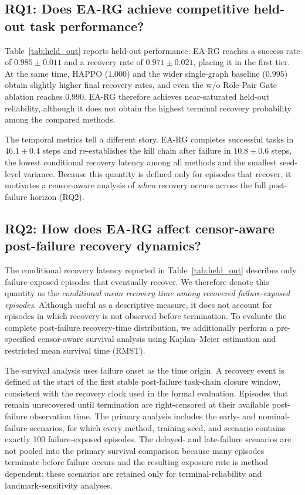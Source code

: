 \subsection{RQ1: Does EA-RG achieve competitive held-out task performance?}

Table~\ref{tab:held_out} reports held-out performance. EA-RG reaches a success rate of $0.985 \pm 0.011$ and a recovery rate of $0.971 \pm 0.021$, placing it in the first tier. At the same time, HAPPO ($1.000$) and the wider single-graph baseline ($0.995$) obtain slightly higher final recovery rates, and even the w/o Role-Pair Gate ablation reaches $0.990$. EA-RG therefore achieves near-saturated held-out reliability, although it does not obtain the highest terminal recovery probability among the compared methods.

The temporal metrics tell a different story. EA-RG completes successful tasks in $46.1 \pm 0.4$ steps and re-establishes the kill chain after failure in $10.8 \pm 0.6$ steps, the lowest conditional recovery latency among all methods and the smallest seed-level variance. Because this quantity is defined only for episodes that recover, it motivates a censor-aware analysis of \emph{when} recovery occurs across the full post-failure horizon (RQ2).



\subsection{RQ2: How does EA-RG affect censor-aware post-failure recovery dynamics?}

The conditional recovery latency reported in Table~\ref{tab:held_out} describes only failure-exposed episodes that eventually recover. We therefore denote this quantity as the \emph{conditional mean recovery time among recovered failure-exposed episodes}. Although useful as a descriptive measure, it does not account for episodes in which recovery is not observed before termination. To evaluate the complete post-failure recovery-time distribution, we additionally perform a pre-specified censor-aware survival analysis using Kaplan--Meier estimation and restricted mean survival time (RMST).

The survival analysis uses failure onset as the time origin. A recovery event is defined at the start of the first stable post-failure task-chain closure window, consistent with the recovery clock used in the formal evaluation. Episodes that remain unrecovered until termination are right-censored at their available post-failure observation time. The primary analysis includes the early- and nominal-failure scenarios, for which every method, training seed, and scenario contains exactly 100 failure-exposed episodes. The delayed- and late-failure scenarios are not pooled into the primary survival comparison because many episodes terminate before failure occurs and the resulting exposure rate is method dependent; these scenarios are retained only for terminal-reliability and landmark-sensitivity analyses.

